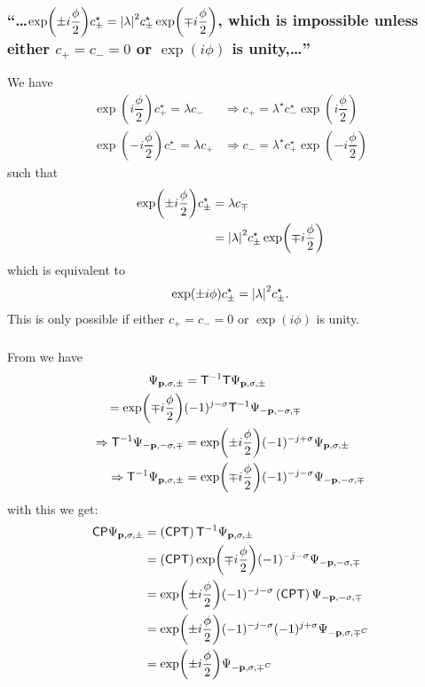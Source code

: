 \subsubsection{\enquote{\dots $\exp(\pm i \dfrac{\phi}{2}) c^\star_\pm=\abs{\lambda}^2 c_\pm^\star \exp(\mp i \dfrac{\phi}{2})$, which is impossible unless either $c_+=c_-=0$ or $\exp(i\phi)$ is unity,\dots} }

We have
\begin{align*}
 	\exp(i\dfrac{\phi}{2})c_+^\star = \lambda c_- &\Rightarrow c_+=\lambda^\star c_-^\star \exp(i\dfrac{\phi}{2})\\
 	\exp(-i\dfrac{\phi}{2})c_-^\star = \lambda c_+ &\Rightarrow c_-=\lambda^\star c_+^\star \exp(-i\dfrac{\phi}{2})
\end{align*}
such that
\begin{align*}
	\exp(\pm i \dfrac{\phi}{2}) c^\star_\pm&=\lambda c_\mp\\
	&=\abs{\lambda}^2 c^\star_\pm \exp(\mp i \dfrac{\phi}{2})
\end{align*}
which is equivalent to 
\[\exp(\pm i {\phi}) c^\star_\pm=\abs{\lambda}^2 c^\star_\pm.\]
This is only possible if either $c_+=c_-=0$ or $\exp(i\phi)$ is unity.

\subsubsection{ }
From  we have
\begin{align*}
	\Psi_{\mathbf{p},\sigma,\pm}&=\mathsf{T}^{-1} \mathsf{T} \Psi_{\mathbf{p},\sigma,\pm}\\
	=\exp(\mp i \dfrac{\phi}{2})&(-1)^{j-\sigma} \mathsf{T}^{-1}\Psi_{-\mathbf{p},-\sigma,\mp}\\
	\Rightarrow\mathsf{T}^{-1}\Psi_{-\mathbf{p},-\sigma,\mp}&=\exp(\pm i \dfrac{\phi}{2})(-1)^{-j+\sigma}\Psi_{\mathbf{p},\sigma,\pm}\\
	\Rightarrow\mathsf{T}^{-1}\Psi_{\mathbf{p},\sigma,\pm}&=\exp(\mp i \dfrac{\phi}{2})(-1)^{-j-\sigma}\Psi_{-\mathbf{p},-\sigma,\mp}
\end{align*}
with this we get:
\begin{align*}
	\mathsf{C} \mathsf{P} \Psi_{\mathbf{p},\sigma,\pm} &=  \left(\mathsf{C} \mathsf{P} \mathsf{T}\right) \mathsf{T}^{-1}\Psi_{\mathbf{p},\sigma,\pm}\\
	&=\left(\mathsf{C} \mathsf{P} \mathsf{T}\right)\exp(\mp i \dfrac{\phi}{2})(-1)^{-j-\sigma}\Psi_{-\mathbf{p},-\sigma,\mp}\\
	&=\exp(\pm i \dfrac{\phi}{2})(-1)^{-j-\sigma}\left(\mathsf{C} \mathsf{P} \mathsf{T}\right)\Psi_{-\mathbf{p},-\sigma,\mp}\\
	&=\exp(\pm i \dfrac{\phi}{2})(-1)^{-j-\sigma}(-1)^{j+\sigma}\Psi_{-\mathbf{p},\sigma,\mp^C}\\
	&=\exp(\pm i \dfrac{\phi}{2})\Psi_{-\mathbf{p},\sigma,\mp^C}
\end{align*}

